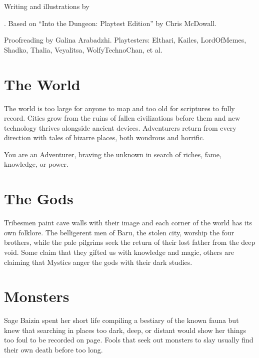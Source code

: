 \documentclass[itdr]{subfiles}
\begin{document}
\begin{minipage}{\textwidth}
\toc[2] %
\end{minipage}

\vfill

\begin{minipage}{\textwidth}
\begin{center}\footnotesize
	Writing and illustrations by \author{}. Based on ``Into the Dungeon: Playtest Edition'' by Chris McDowall.
	
	Proofreading by Galina Arabadzhi. Playtesters: Elthari, Kailes, LordOfMemes, Shadko, Thalia, Veyalitsa, WolfyTechnoChan, et al.
\end{center}
\end{minipage}

\clearpage

\label{ch:introduction}

\section*{The World}

The world is too large for anyone to map and too old for scriptures to fully record. Cities grow from the ruins of fallen civilizations before them and new technology thrives alongside ancient devices. \mbox{Adventurers} return from every direction with tales of bizarre places, both wondrous and horrific.

You are an Adventurer, braving the unknown in search of riches, fame, knowledge, or power.

\section*{The Gods}

Tribesmen paint cave walls with their image and each corner of the world has its own folklore. The belligerent men of Baru, the stolen city, worship the four brothers, while the pale pilgrims seek the return of their lost father from the deep void. Some claim that they gifted us with knowledge and magic, others are claiming that Mystics anger the gods with their dark studies.

\section*{Monsters}

Sage Baizin spent her short life compiling a bestiary of the known fauna but knew that searching in places too dark, deep, or distant would show her things too foul to be recorded on page. Fools that seek out monsters to slay usually find their own death before too long.
\end{document}
